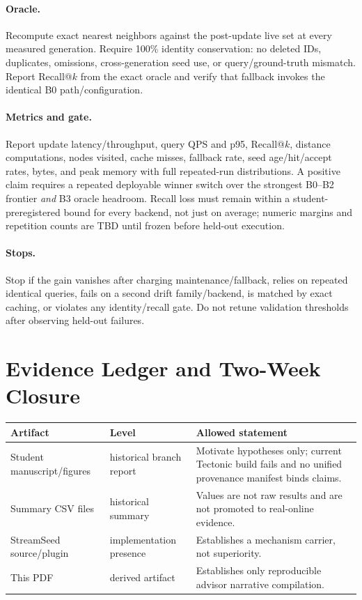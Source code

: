 \documentclass[10pt]{article}
\begin{document}
\paragraph{Oracle.} Recompute exact nearest neighbors against the post-update live set at every measured generation.  Require 100\% identity conservation: no deleted IDs, duplicates, omissions, cross-generation seed use, or query/ground-truth mismatch.  Report Recall@$k$ from the exact oracle and verify that fallback invokes the identical B0 path/configuration.

\paragraph{Metrics and gate.} Report update latency/throughput, query QPS and p95, Recall@$k$, distance computations, nodes visited, cache misses, fallback rate, seed age/hit/accept rates, bytes, and peak memory with full repeated-run distributions.  A positive claim requires a repeated deployable winner switch over the strongest B0--B2 frontier \emph{and} B3 oracle headroom.  Recall loss must remain within a student-preregistered bound for every backend, not just on average; numeric margins and repetition counts are TBD until frozen before held-out execution.

\paragraph{Stops.} Stop if the gain vanishes after charging maintenance/fallback, relies on repeated identical queries, fails on a second drift family/backend, is matched by exact caching, or violates any identity/recall gate.  Do not retune validation thresholds after observing held-out failures.

\section{Evidence Ledger and Two-Week Closure}
\begin{tabularx}{\linewidth}{@{}>{\raggedright\arraybackslash}p{.22\linewidth}>{\raggedright\arraybackslash}p{.18\linewidth}X@{}}
\toprule Artifact & Level & Allowed statement\\\midrule
Student manuscript/figures & historical branch report & Motivate hypotheses only; current Tectonic build fails and no unified provenance manifest binds claims.\\
Summary CSV files & historical summary & Values are not raw results and are not promoted to real-online evidence.\\
StreamSeed source/plugin & implementation presence & Establishes a mechanism carrier, not superiority.\\
This PDF & derived artifact & Establishes only reproducible advisor narrative compilation.\\\bottomrule
\end{tabularx}
\end{document}
